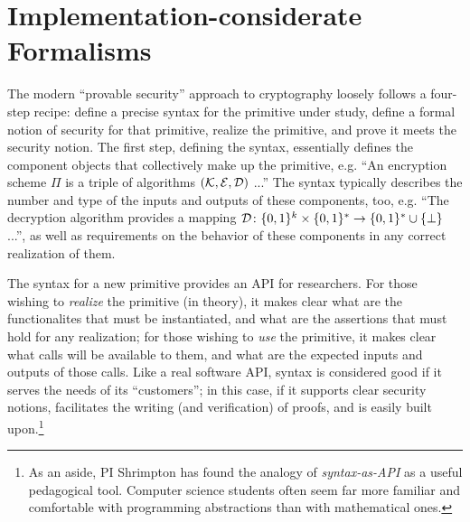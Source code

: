 \section{Implementation-considerate Formalisms}
\label{sec:formalisms}
The modern ``provable security'' approach to cryptography loosely follows a
four-step recipe: define a precise syntax for the primitive under study, define
a formal notion of security for that primitive, realize the primitive,
and prove it meets the security notion. The first step, defining the syntax,
essentially defines the component objects that collectively make up the
primitive, e.g. ``An encryption scheme $\Pi$ is a triple of algorithms
$(\mathcal{K},\mathcal{E},\mathcal{D})$ ...''  The syntax typically describes the number and type
of the inputs and outputs of these components, too, e.g. ``The decryption
algorithm provides a mapping $\mathcal{D}\colon\{0,1\}^{k}\times\{0,1\}^* \to \{0,1\}^* \cup
\{\bot\}$ ...'', as well as requirements on the behavior of these components in
any correct realization of them.

%
The syntax for a new primitive provides an API for researchers. For
those wishing to \emph{realize} the primitive (in theory), it makes clear what
are the functionalites that must be instantiated, and what are the assertions that
must hold for any realization; for those wishing to \emph{use} the primitive, it
makes clear what calls will be available to them, and what are the expected
inputs and outputs of those calls.
%
Like a real software API, syntax is considered good if it serves the needs of
its ``customers''; in this case, if it supports clear security notions,
facilitates the writing (and verification) of proofs, and is easily built
upon.\footnote{As an aside, PI Shrimpton has found the analogy of
\emph{syntax-as-API} as a useful pedagogical tool. Computer science students
often seem far more familiar and comfortable with programming abstractions than
with mathematical ones.}


